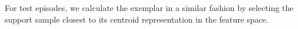 For test episodes, we calculate the exemplar in a similar fashion by selecting the support sample closest to its centroid representation in the feature space.




